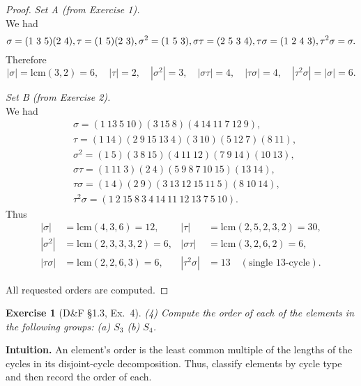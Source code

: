 \documentclass[12pt]{article}
\newtheorem{exercise}[theorem]{Exercise}
\theoremstyle{definition}
\begin{document}
\begin{proof}
\noindent\emph{Set A (from Exercise 1).}\\
We had
\[
\sigma=(1\ 3\ 5)(2\ 4),\\
\tau=(1\ 5)(2\ 3),\\
\sigma^2=(1\ 5\ 3),\\
\sigma\tau=(2\ 5\ 3\ 4),\tau\sigma=(1\ 2\ 4\ 3),\\
\tau^2\sigma=\sigma.
\]
Therefore
\[
|\sigma|=\mathrm{lcm}(3,2)=6,\quad |\tau|=2,\quad |\sigma^2|=3,\quad
|\sigma\tau|=4,\quad |\tau\sigma|=4,\quad |\tau^2\sigma|=|\sigma|=6.
\]

\dotfill

\noindent\emph{Set B (from Exercise 2).}\\
We had
\[
\begin{aligned}
&\sigma=(1\ 13\ 5\ 10)(3\ 15\ 8)(4\ 14\ 11\ 7\ 12\ 9),\\
&\tau=(1\ 14)(2\ 9\ 15\ 13\ 4)(3\ 10)(5\ 12\ 7)(8\ 11),\\
&\sigma^{2}=(1\ 5)(3\ 8\ 15)(4\ 11\ 12)(7\ 9\ 14)(10\ 13),\\
&\sigma\tau=(1\ 11\ 3)(2\ 4)(5\ 9\ 8\ 7\ 10\ 15)(13\ 14),\\
&\tau\sigma=(1\ 4)(2\ 9)(3\ 13\ 12\ 15\ 11\ 5)(8\ 10\ 14),\\
&\tau^{2}\sigma=(1\ 2\ 15\ 8\ 3\ 4\ 14\ 11\ 12\ 13\ 7\ 5\ 10).
\end{aligned}
\]
Thus
\[
\begin{aligned}
|\sigma|&=\mathrm{lcm}(4,3,6)=12, &
|\tau|&=\mathrm{lcm}(2,5,2,3,2)=30,\\
|\sigma^{2}|&=\mathrm{lcm}(2,3,3,3,2)=6, &
|\sigma\tau|&=\mathrm{lcm}(3,2,6,2)=6,\\
|\tau\sigma|&=\mathrm{lcm}(2,2,6,3)=6, &
|\tau^{2}\sigma|&=13\quad(\text{single $13$-cycle}).
\end{aligned}
\]

\dotfill

All requested orders are computed.
\end{proof}

\newpage

\begin{exercise}[D\&F §1.3, Ex.~4]
(4) Compute the order of each of the elements in the following groups: (a) $S_3$ (b) $S_4$.
\end{exercise}

\dotfill

\noindent
\textbf{Intuition.}
An element’s order is the least common multiple of the lengths of the cycles
in its disjoint-cycle decomposition. Thus, classify elements by cycle type
and then record the order of each.
\end{document}
